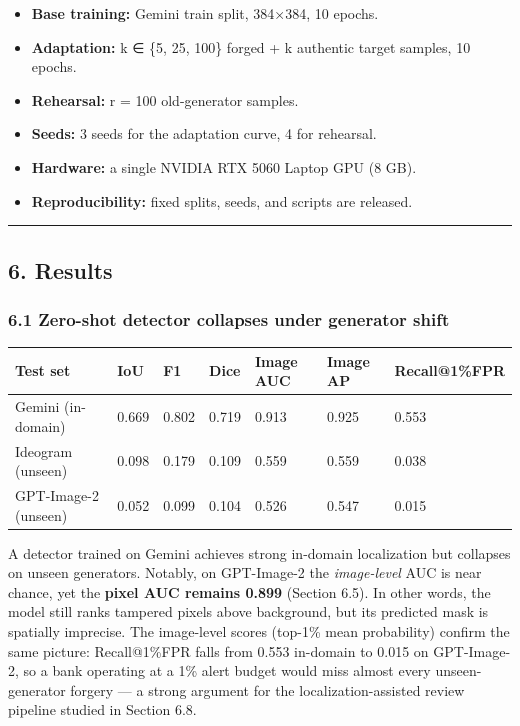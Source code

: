 \begin{itemize}
\tightlist
\item
  \textbf{Base training:} Gemini train split, 384×384, 10 epochs.
\item
  \textbf{Adaptation:} k ∈ \{5, 25, 100\} forged + k authentic target samples, 10 epochs.
\item
  \textbf{Rehearsal:} r = 100 old-generator samples.
\item
  \textbf{Seeds:} 3 seeds for the adaptation curve, 4 for rehearsal.
\item
  \textbf{Hardware:} a single NVIDIA RTX 5060 Laptop GPU (8 GB).
\item
  \textbf{Reproducibility:} fixed splits, seeds, and scripts are released.
\end{itemize}

\begin{center}\rule{0.5\linewidth}{0.5pt}\end{center}

\subsection{6. Results}\label{results}

\subsubsection{6.1 Zero-shot detector collapses under generator shift}\label{zero-shot-detector-collapses-under-generator-shift}

{\def\LTcaptype{none} %
\begin{longtable}[]{@{}lllllll@{}}
\toprule\noalign{}
Test set & IoU & F1 & Dice & Image AUC & Image AP & Recall@1\%FPR \\
\midrule\noalign{}
\endhead
\bottomrule\noalign{}
\endlastfoot
Gemini (in-domain) & 0.669 & 0.802 & 0.719 & 0.913 & 0.925 & 0.553 \\
Ideogram (unseen) & 0.098 & 0.179 & 0.109 & 0.559 & 0.559 & 0.038 \\
GPT-Image-2 (unseen) & 0.052 & 0.099 & 0.104 & 0.526 & 0.547 & 0.015 \\
\end{longtable}
}

A detector trained on Gemini achieves strong in-domain localization but collapses on unseen generators. Notably, on GPT-Image-2 the \emph{image-level} AUC is near chance, yet the \textbf{pixel AUC remains 0.899} (Section 6.5). In other words, the model still ranks tampered pixels above background, but its predicted mask is spatially imprecise. The image-level scores (top-1\% mean probability) confirm the same picture: Recall@1\%FPR falls from 0.553 in-domain to 0.015 on GPT-Image-2, so a bank operating at a 1\% alert budget would miss almost every unseen-generator forgery --- a strong argument for the localization-assisted review pipeline studied in Section 6.8.

